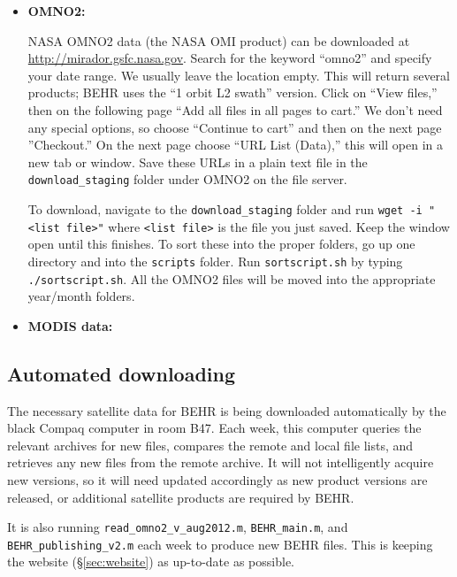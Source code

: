 \documentclass[12pt]{article}
\begin{document}
	\begin{itemize}
	
	\item \textbf{OMNO2:}
	
		NASA OMNO2 data (the NASA OMI  product) can be downloaded at \url{http://mirador.gsfc.nasa.gov}. Search for the keyword ``omno2'' and specify your date range. We usually leave the location empty. This will return several products; BEHR uses the ``1 orbit L2 swath'' version. Click on ``View files,'' then on the following page ``Add all files in all pages to cart.''  We don't need any special options, so choose ``Continue to cart'' and then on the next page ''Checkout.'' On the next page choose ``URL List (Data),'' this will open in a new tab or window. Save these URLs in a plain text file in the \texttt{download\_staging} folder under OMNO2 on the file server. 
		
		To download, navigate to the \texttt{download\_staging} folder and run \texttt{wget -i "<list file>"} where \texttt{<list file>} is the file you just saved. Keep the window open until this finishes. To sort these into the proper folders, go up one directory and into the \texttt{scripts} folder. Run \texttt{sortscript.sh} by typing \texttt{./sortscript.sh}. All the OMNO2 files will be moved into the appropriate year/month folders.
	
	\item \textbf{MODIS data:}
	
		
	\end{itemize}


	\subsection{Automated downloading}
	
		The necessary satellite data for BEHR is being downloaded automatically by the black Compaq computer in room B47. Each week, this computer queries the relevant archives for new files, compares the remote and local file lists, and retrieves any new files from the remote archive.  It will not intelligently acquire new versions, so it will need updated accordingly as new product versions are released, or additional satellite products are required by BEHR.
		
		It is also running \lstinline$read_omno2_v_aug2012.m$, \lstinline$BEHR_main.m$, and \lstinline$BEHR_publishing_v2.m$ each week to produce new BEHR files. This is keeping the website (\S\ref{sec:website}) as up-to-date as possible.
		
\end{document}

